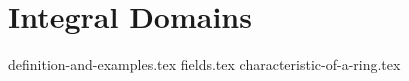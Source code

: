 \chapter{Integral Domains}
{definition-and-examples.tex}
{fields.tex}
{characteristic-of-a-ring.tex}
